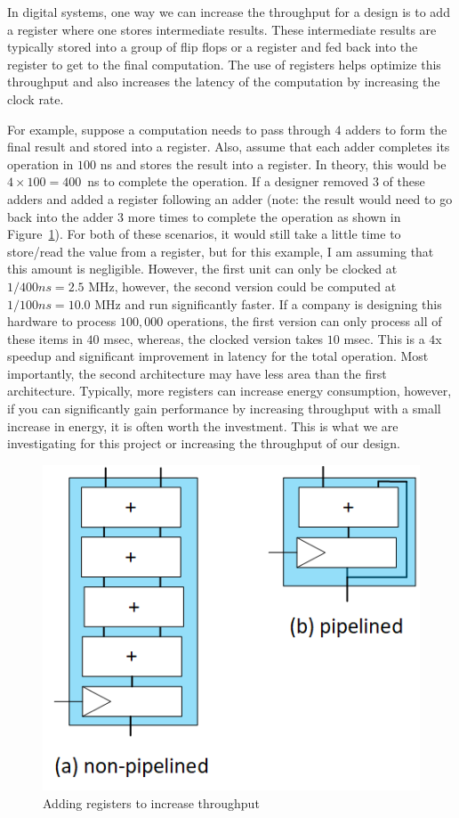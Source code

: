 \documentclass{article}
\begin{document}
In digital systems, one way we can increase the throughput for a
design is to add a register where one stores intermediate results.
These intermediate results are typically stored into a group of flip
flops or a register and fed back into the register to get to the final
computation.  The use of registers helps optimize this throughput and
also increases the latency of the computation by increasing the clock
rate.

For example, suppose a computation needs to pass through $4$
adders to form the final result and stored into a register.
Also, assume that each adder
completes its operation in $100$ ns and stores the result into a
register.  In theory, this would be $4 \times 100 = 400$~ns to
complete the operation.
If a designer removed $3$ of these adders and
added a register following an adder (note: the result would need to go back
into the adder $3$ more times to complete the operation as shown in
Figure~\ref{throughput1.fig}).
For both of these scenarios, it
would still take a little time to store/read the value from a
register, but for this example, I am assuming that this amount is
negligible.  
However, the first unit can only be clocked at $1/400ns = 2.5$ MHz,
however, the second version could be computed at $1/100ns = 10.0$ MHz and run
significantly faster.  If a company is designing this hardware to process $100,000$
operations, the first version can only process all of these items in
$40$ msec, whereas, the clocked version takes $10$ msec.  This is a
$4$x speedup and significant improvement in latency for the total
operation.
Most importantly, the second architecture may have less area
than the first architecture.  Typically, more registers can increase energy
consumption, however, if you can significantly gain performance by increasing
throughput with a small increase in energy, it is often worth the
investment.  This is what we are investigating for this project or
increasing the throughput of our design.
\begin{figure} [t!]
  \centering
  \includegraphics[scale=1.2]{throughput1.png}
  \caption{Adding registers to increase throughput}
  \label{throughput1.fig}
\end{figure}
\end{document}

